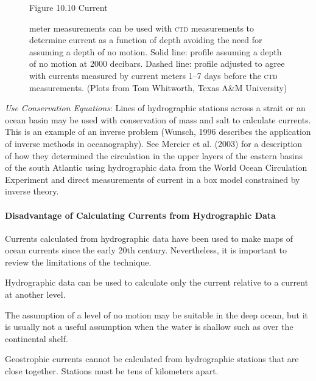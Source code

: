 \begin{enumerate}
\begin{figure}[t!]
\footnotesize
Figure 10.10 Current \rule{0mm}{3ex }meter measurements can be used
with \textsc{ctd} measurements to determine current as a
function of depth avoiding the need for assuming a depth of no
motion. Solid line: profile assuming a depth of no motion at 2000
decibars. Dashed line: profile adjusted to agree with currents
measured by current meters 1--7 days before the \textsc{ctd}
measurements.  (Plots from Tom Whitworth, Texas A\&M University)
\label{fig:whitplot}
\vspace{-3ex}
\end{figure}

\vitem \textit{Use Conservation Equations}: Lines of hydrographic
stations across a strait or an ocean
basin may be used with conservation of mass and salt to calculate
currents. This is an example of an inverse problem (Wunsch, 1996
describes the application of inverse methods in oceanography). See
Mercier et al. (2003) for a description of how they determined the
circulation in the upper layers of the eastern basins of the south
Atlantic using hydrographic data from the World Ocean Circulation
Experiment and direct measurements of current in a box model constrained by inverse theory.
\end{enumerate}

\paragraph{Disadvantage of Calculating Currents from Hydrographic Data}
Currents calculated from
hydrographic data
have been used to make maps of ocean currents since the early 20th
century. Nevertheless, it is important to review the limitations of
the technique.

\begin{enumerate}
\vitem Hydrographic data can be used to calculate only the current relative to a
current at another level.

\vitem The assumption of a level of no motion may be suitable in the
deep ocean, but it is usually not a useful assumption when the water
is shallow such as over the continental shelf.

\vitem Geostrophic currents cannot be calculated from hydrographic
stations that are
close together. Stations must be tens of kilometers apart.

\end{enumerate}

